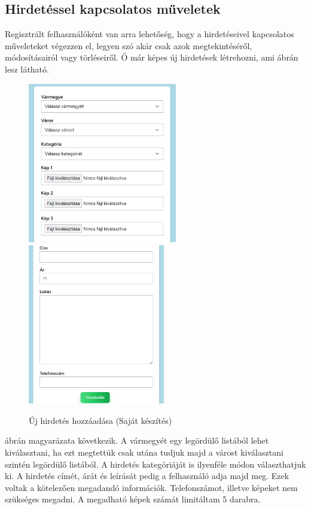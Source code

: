 \documentclass[]{thesis-ekf}
\theoremstyle{definition}
\theoremstyle{remark}
\begin{document}
	\subsection{Hirdetéssel kapcsolatos műveletek}
	Regisztrált felhasználóként van arra lehetőség, hogy a hirdetéseivel kapcsolatos műveleteket végezzen el, legyen szó akár csak azok megtekintéséről, módosításairól vagy törléseiről. Ő már képes új hirdetések létrehozni, ami  ábrán lesz látható.
	\begin{figure}[ht!]
		\centering
		\includegraphics[height=7cm]{./felhasznaloi/hozzadas1}
		\includegraphics[height=7cm]{./felhasznaloi/hozzadas2}
		\caption{Új hirdetés hozzáadása (Saját készítés)} 
		\label{hirdetes-hozzadas-muvelet}
	\end{figure}
	 ábrán magyarázata következik. A vármegyét egy legördülő listából lehet kiválasztani, ha ezt megtettük csak utána tudjuk majd a várost kiválasztani szintén legördülő listából. A hirdetés kategóriáját is ilyenféle módon választhatjuk ki. A hirdetés címét, árát és leírását pedig a felhasználó adja majd meg. Ezek voltak a kötelezően megadandó információk. Telefonszámot, illetve képeket nem szükséges megadni. A megadható képek számát limitáltam 5 darabra.
\end{document}
